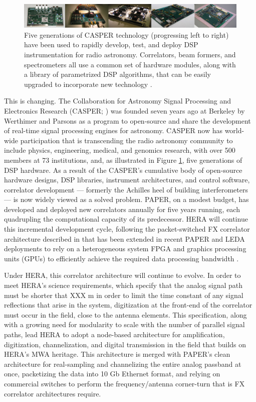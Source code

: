 \documentclass[preprint]{aastex}
\begin{document}
\begin{figure}[!ht]\centering
\includegraphics[width=6.5in]{plots/casper_boards.jpg}
\caption{
Five generations of CASPER technology (progressing left to right) have been used to rapidly
develop, test, and deploy DSP instrumentation for radio astronomy.  Correlators,
beam formers, and spectrometers all use a common set of hardware modules, along with a library
of parametrized DSP algorithms, that can be easily upgraded to incorporate new technology
\citep{parsons_et_al2006,parsons_et_al2008}.
}\label{fig:casper_boards}
\end{figure}

This is changing.  The Collaboration for Astronomy Signal Processing and Electronics Research
(CASPER; \citealt{parsons_et_al2006}) was founded seven years ago at Berkeley
by Werthimer and Parsons as a program 
to open-source and share the development of real-time signal processing engines for astronomy.
CASPER now has world-wide participation that is
transcending the radio astronomy community to include physics, engineering,
medical, and genomics research, with
over 500 members at 73 institutions, and, as illustrated in
Figure \ref{fig:casper_boards}, five generations of DSP hardware.
As a result of the CASPER's cumulative body of open-source hardware designs, DSP libraries, instrument
architectures, and control software,
correlator development --- formerly the Achilles heel of building interferometers ---
is now widely viewed as a solved problem.  PAPER, on a modest budget, has developed and deployed new correlators
annually for five years running, each quadrupling the computational capacity of its predecessor.
HERA will continue this incremental development cycle, following the packet-switched
FX correlator architecture described in \citet{parsons_et_al2008} that has been
extended in recent PAPER and LEDA deployments to rely on a heterogeneous system FPGA and graphics processing units (GPUs)
to efficiently achieve the required data processing bandwidth \citep{clark_et_al2011}.

Under HERA, this correlator architecture will continue to evolve.  In order to meet HERA's science requirements,
which specify that the analog signal path must be shorter that XXX m in order to limit the time constant of any signal reflections
that arise in the system, digitization at the front-end of the correlator must occur in the field, close to the antenna
elements.  This specification, along with a growing need for modularity to scale with the number of parallel signal paths,
lead HERA to adopt a node-based architecture for amplification, digitization, channelization, and digital
transmission in the field that builds on HERA's MWA heritage.  This architecture is merged with PAPER's clean 
architecture for real-sampling and channelizing the entire analog passband at once, packetizing the data into
10 Gb Ethernet format, and relying on commercial switches to perform the frequency/antenna corner-turn that is
FX correlator architectures require. 
\end{document}
